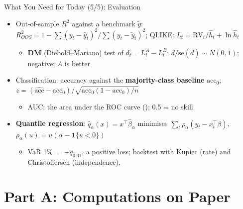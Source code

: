 \begin{frame}{What You Need for Today (5/5): Evaluation}
\itemsize{\footnotesize}
\begin{itemize}
    \item Out-of-sample $R^2$ against a benchmark $\tilde y$: $R^2_{OOS} = 1 - \sum(y_t - \hat y_t)^2/\sum(y_t - \tilde y_t)^2$; QLIKE: $L_t = \mathrm{RV}_t/\hat h_t + \ln\hat h_t$
    \begin{itemize}
        \item \textbf{DM} (Diebold--Mariano) test of $d_t = L_t^A - L_t^B$: $\bar d/\mathrm{se}(\bar d) \sim N(0, 1)$; negative: $A$ is better
    \end{itemize}
    \item Classification: accuracy against the \textbf{majority-class baseline} $\mathrm{acc}_0$; $z = (\widehat{\mathrm{acc}} - \mathrm{acc}_0)/\sqrt{\mathrm{acc}_0(1 - \mathrm{acc}_0)/n}$
    \begin{itemize}
        \item AUC: the area under the ROC curve (); 0.5 = no skill
    \end{itemize}
    \item \textbf{Quantile regression}: $\hat q_\alpha(x) = x^\top\hat\beta_\alpha$ minimises $\sum_t \rho_\alpha(y_t - x_t^\top\beta)$, $\rho_\alpha(u) = u(\alpha - \mathbf{1}\{u < 0\})$
    \begin{itemize}
        \item VaR 1\% $= -\hat q_{0.01}$, a positive loss; backtest with Kupiec (rate) and Christoffersen (independence), 
    \end{itemize}
\end{itemize}
\end{frame}


\section{Part A: Computations on Paper}

